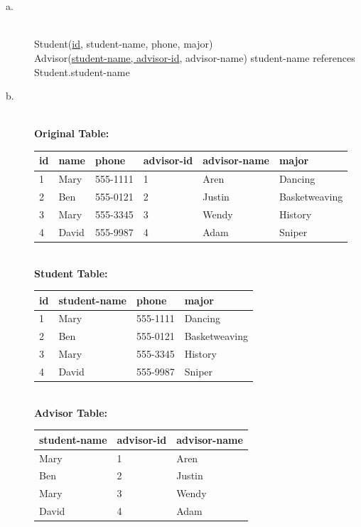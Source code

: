 \documentclass{article}
\begin{document}
\section{}
\begin{description}
\item[a.]
\ \\
Student(\underline{id}, student-name, phone, major)\\
Advisor(\underline{student-name, advisor-id}, advisor-name) student-name references
Student.student-name\\
\item[b.]
\textbf{\\Original Table:\\}
\begin{tabular}{l|l|l|l|l|l}
id & name & phone    & advisor-id & advisor-name & major\\
\hline
1  & Mary  & 555-1111 & 1          & Aren         & Dancing\\
2  & Ben   & 555-0121 & 2          & Justin       & Basketweaving\\
3  & Mary  & 555-3345 & 3          & Wendy        & History\\
4  & David & 555-9987 & 4          & Adam         & Sniper\\
\end{tabular}
\textbf{\\Student Table:\\}
\begin{tabular}{l|l|l|l}
id & student-name & phone    & major\\
\hline
1  & Mary         & 555-1111 & Dancing\\
2  & Ben          & 555-0121 & Basketweaving\\
3  & Mary         & 555-3345 & History\\
4  & David        & 555-9987 & Sniper\\
\end{tabular}
\textbf{\\Advisor Table:\\}
\begin{tabular}{l|l|l}
student-name & advisor-id & advisor-name\\
\hline
Mary         & 1          & Aren\\
Ben          & 2          & Justin\\
Mary         & 3          & Wendy\\
David        & 4          & Adam\\
\end{tabular}

\end{description}
\end{document}

